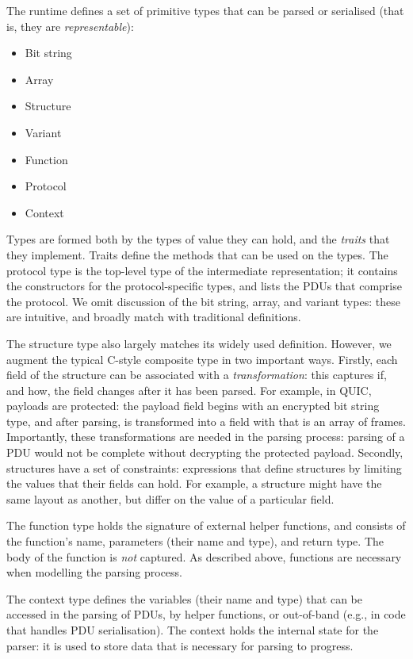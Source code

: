 \documentclass[10pt,sigconf]{acmart}
\begin{document}
The runtime defines a set of primitive types that can be parsed or serialised (that is,
they are \emph{representable}):
\begin{itemize}
	\item Bit string
	\item Array
	\item Structure 
	\item Variant
	\item Function
	\item Protocol
	\item Context
\end{itemize}

Types are formed both by the types of value they can hold, and the \emph{traits} that they
implement. Traits define the methods that can be used on the types. The protocol type is
the top-level type of the intermediate representation; it contains the constructors for
the protocol-specific types, and lists the PDUs that comprise the protocol. We omit
discussion of the bit string, array, and variant types: these are intuitive, and broadly
match with traditional definitions.

The structure type also largely matches its widely used definition.
However, we augment the typical C-style composite type in two important ways. Firstly, each field of
the structure can be associated with a \emph{transformation}: this captures if, and how,
the field changes after it has been parsed. For example, in QUIC, payloads are protected:
the payload field begins with an encrypted bit string type, and after parsing, is
transformed into a field with that is an array of frames. Importantly, these
transformations are needed in the parsing process: parsing of a PDU would not be complete
without decrypting the protected payload. Secondly, structures have a set of constraints:
expressions that define structures by limiting the values that their fields can hold. For
example, a structure might have the same layout as another, but differ on the value of a
particular field.

The function type holds the signature of external helper functions, and consists of the
function's name, parameters (their name and type), and return type. The body of the
function is \emph{not} captured. As described above, functions are necessary when
modelling the parsing process.

The context type defines the variables (their name and type) that can be accessed in the
parsing of PDUs, by helper functions, or out-of-band (e.g., in code that handles PDU
serialisation). The context holds the internal state for the parser: it is used to store
data that is necessary for parsing to progress.
\end{document}
